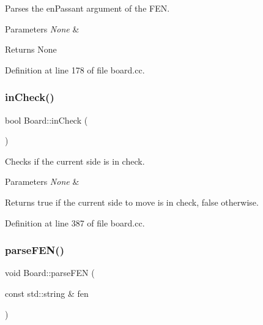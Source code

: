 Parses the en\+Passant argument of the F\+EN. 


\begin{DoxyParams}{Parameters}
{\em None} & \\
\hline
\end{DoxyParams}
\begin{DoxyReturn}{Returns}
None 
\end{DoxyReturn}


Definition at line 178 of file board.\+cc.

\mbox{\label{classBoard_a05bfcc94444986be0ae0f2ad694d629a}} 
\subsubsection{\texorpdfstring{in\+Check()}{inCheck()}}
{\footnotesize\ttfamily bool Board\+::in\+Check (\begin{DoxyParamCaption}{ }\end{DoxyParamCaption})\hspace{0.3cm}{\ttfamily [noexcept]}}



Checks if the current side is in check. 


\begin{DoxyParams}{Parameters}
{\em None} & \\
\hline
\end{DoxyParams}
\begin{DoxyReturn}{Returns}
true if the current side to move is in check, false otherwise. 
\end{DoxyReturn}


Definition at line 387 of file board.\+cc.

\mbox{\label{classBoard_a7cab67d5057bca8aeeb54a3cb84a1580}} 
\subsubsection{\texorpdfstring{parse\+F\+E\+N()}{parseFEN()}}
{\footnotesize\ttfamily void Board\+::parse\+F\+EN (\begin{DoxyParamCaption}\item[{const std\+::string \&}]{fen }\end{DoxyParamCaption})\hspace{0.3cm}{\ttfamily [noexcept]}}




